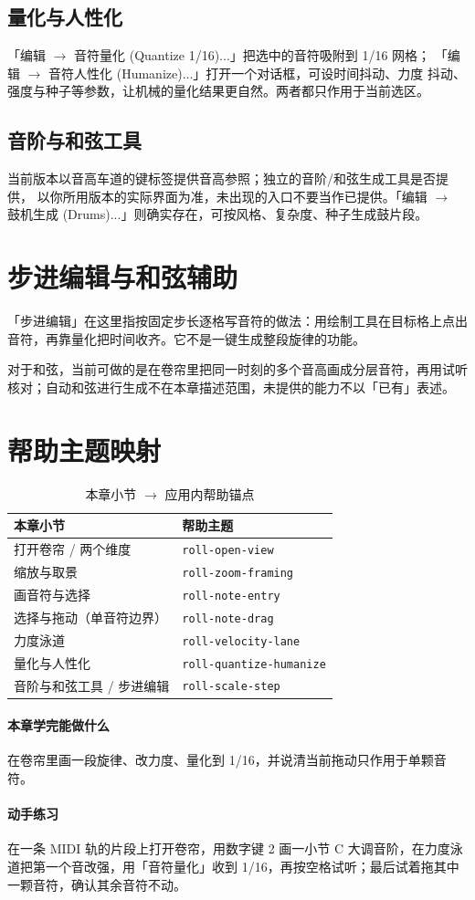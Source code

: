 \subsection{量化与人性化}

「编辑 $\to$ 音符量化 (Quantize 1/16)...」把选中的音符吸附到 1/16 网格；
「编辑 $\to$ 音符人性化 (Humanize)...」打开一个对话框，可设时间抖动、力度
抖动、强度与种子等参数，让机械的量化结果更自然。两者都只作用于当前选区。


\subsection{音阶与和弦工具}

当前版本以音高车道的键标签提供音高参照；独立的音阶/和弦生成工具是否提供，
以你所用版本的实际界面为准，未出现的入口不要当作已提供。「编辑 $\to$ 鼓机生成
(Drums)...」则确实存在，可按风格、复杂度、种子生成鼓片段。

\section{步进编辑与和弦辅助}

「步进编辑」在这里指按固定步长逐格写音符的做法：用绘制工具在目标格上点出
音符，再靠量化把时间收齐。它不是一键生成整段旋律的功能。

对于和弦，当前可做的是在卷帘里把同一时刻的多个音高画成分层音符，再用试听
核对；自动和弦进行生成不在本章描述范围，未提供的能力不以「已有」表述。

\section{帮助主题映射}

\begin{table}[htbp]
\centering
\caption{本章小节 $\to$ 应用内帮助锚点}
\label{tab:ch04-help}
\begin{tabular}{ll}
\hline
本章小节 & 帮助主题 \\
\hline
打开卷帘 / 两个维度 & \texttt{roll-open-view} \\
缩放与取景 & \texttt{roll-zoom-framing} \\
画音符与选择 & \texttt{roll-note-entry} \\
选择与拖动（单音符边界） & \texttt{roll-note-drag} \\
力度泳道 & \texttt{roll-velocity-lane} \\
量化与人性化 & \texttt{roll-quantize-humanize} \\
音阶与和弦工具 / 步进编辑 & \texttt{roll-scale-step} \\
\hline
\end{tabular}
\end{table}

\paragraph{本章学完能做什么} 在卷帘里画一段旋律、改力度、量化到 1/16，并说清当前拖动只作用于单颗音符。

\paragraph{动手练习} 在一条 MIDI 轨的片段上打开卷帘，用数字键 2 画一小节 C 大调音阶，在力度泳道把第一个音改强，用「音符量化」收到 1/16，再按空格试听；最后试着拖其中一颗音符，确认其余音符不动。
